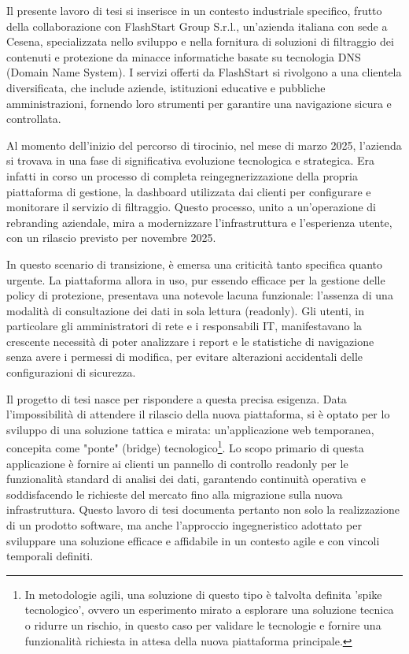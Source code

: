 \documentclass[12pt,a4paper,openright,twoside]{book}
\begin{document}
Il presente lavoro di tesi si inserisce in un contesto industriale specifico, frutto della collaborazione con FlashStart Group S.r.l., un'azienda italiana con sede a Cesena, specializzata nello sviluppo e nella fornitura di soluzioni di filtraggio dei contenuti e protezione da minacce informatiche basate su tecnologia DNS (Domain Name System). I servizi offerti da FlashStart si rivolgono a una clientela diversificata, che include aziende, istituzioni educative e pubbliche amministrazioni, fornendo loro strumenti per garantire una navigazione sicura e controllata.

Al momento dell'inizio del percorso di tirocinio, nel mese di marzo 2025, l'azienda si trovava in una fase di significativa evoluzione tecnologica e strategica. Era infatti in corso un processo di completa reingegnerizzazione della propria piattaforma di gestione, la dashboard utilizzata dai clienti per configurare e monitorare il servizio di filtraggio. Questo processo, unito a un'operazione di rebranding aziendale, mira a modernizzare l'infrastruttura e l'esperienza utente, con un rilascio previsto per novembre 2025.

In questo scenario di transizione, è emersa una criticità tanto specifica quanto urgente. La piattaforma allora in uso, pur essendo efficace per la gestione delle policy di protezione, presentava una notevole lacuna funzionale: l'assenza di una modalità di consultazione dei dati in sola lettura (readonly). Gli utenti, in particolare gli amministratori di rete e i responsabili IT, manifestavano la crescente necessità di poter analizzare i report e le statistiche di navigazione senza avere i permessi di modifica, per evitare alterazioni accidentali delle configurazioni di sicurezza.

Il progetto di tesi nasce per rispondere a questa precisa esigenza. Data l'impossibilità di attendere il rilascio della nuova piattaforma, si è optato per lo sviluppo di una soluzione tattica e mirata: un'applicazione web temporanea, concepita come "ponte" (bridge) tecnologico\footnote{In metodologie agili, una soluzione di questo tipo è talvolta definita 'spike tecnologico', ovvero un esperimento mirato a esplorare una soluzione tecnica o ridurre un rischio, in questo caso per validare le tecnologie e fornire una funzionalità richiesta in attesa della nuova piattaforma principale.}. Lo scopo primario di questa applicazione è fornire ai clienti un pannello di controllo readonly per le funzionalità standard di analisi dei dati, garantendo continuità operativa e soddisfacendo le richieste del mercato fino alla migrazione sulla nuova infrastruttura. Questo lavoro di tesi documenta pertanto non solo la realizzazione di un prodotto software, ma anche l'approccio ingegneristico adottato per sviluppare una soluzione efficace e affidabile in un contesto agile e con vincoli temporali definiti.
\end{document}
